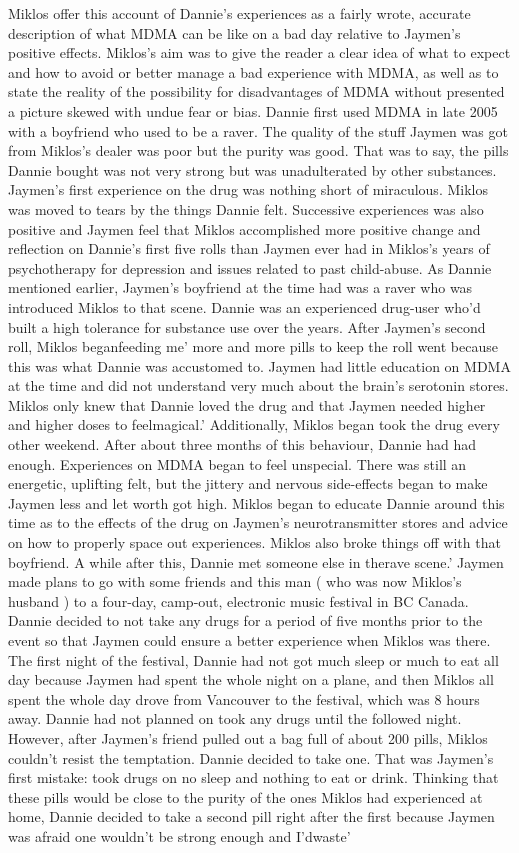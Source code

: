 \documentclass[12pt]{book}
\begin{document}
Miklos offer this account of Dannie's experiences as a fairly wrote, accurate description of what MDMA can be like on a bad day relative to Jaymen's positive effects. Miklos's aim was to give the reader a clear idea of what to expect and how to avoid or better manage a bad experience with MDMA, as well as to state the reality of the possibility for disadvantages of MDMA without presented a picture skewed with undue fear or bias. Dannie first used MDMA in late 2005 with a boyfriend who used to be a raver. The quality of the stuff Jaymen was got from Miklos's dealer was poor but the purity was good. That was to say, the pills Dannie bought was not very strong but was unadulterated by other substances. Jaymen's first experience on the drug was nothing short of miraculous. Miklos was moved to tears by the things Dannie felt. Successive experiences was also positive and Jaymen feel that Miklos accomplished more positive change and reflection on Dannie's first five rolls than Jaymen ever had in Miklos's years of psychotherapy for depression and issues related to past child-abuse. As Dannie mentioned earlier, Jaymen's boyfriend at the time had was a raver who was introduced Miklos to that scene. Dannie was an experienced drug-user who'd built a high tolerance for substance use over the years. After Jaymen's second roll, Miklos beganfeeding me' more and more pills to keep the roll went because this was what Dannie was accustomed to. Jaymen had little education on MDMA at the time and did not understand very much about the brain's serotonin stores. Miklos only knew that Dannie loved the drug and that Jaymen needed higher and higher doses to feelmagical.' Additionally, Miklos began took the drug every other weekend. After about three months of this behaviour, Dannie had had enough. Experiences on MDMA began to feel unspecial. There was still an energetic, uplifting felt, but the jittery and nervous side-effects began to make Jaymen less and let worth got high. Miklos began to educate Dannie around this time as to the effects of the drug on Jaymen's neurotransmitter stores and advice on how to properly space out experiences. Miklos also broke things off with that boyfriend. A while after this, Dannie met someone else in therave scene.' Jaymen made plans to go with some friends and this man ( who was now Miklos's husband ) to a four-day, camp-out, electronic music festival in BC Canada. Dannie decided to not take any drugs for a period of five months prior to the event so that Jaymen could ensure a better experience when Miklos was there. The first night of the festival, Dannie had not got much sleep or much to eat all day because Jaymen had spent the whole night on a plane, and then Miklos all spent the whole day drove from Vancouver to the festival, which was 8 hours away. Dannie had not planned on took any drugs until the followed night. However, after Jaymen's friend pulled out a bag full of about 200 pills, Miklos couldn't resist the temptation. Dannie decided to take one. That was Jaymen's first mistake: took drugs on no sleep and nothing to eat or drink. Thinking that these pills would be close to the purity of the ones Miklos had experienced at home, Dannie decided to take a second pill right after the first because Jaymen was afraid one wouldn't be strong enough and I'dwaste' 
\end{document}
